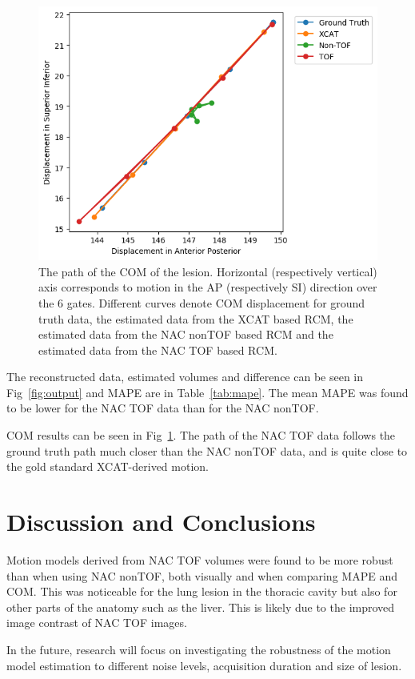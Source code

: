 \documentclass[10pt,twocolumn,twoside,letterpaper]{IEEEtran}
\begin{document}
\begin{figure}[H]
    \centering
    \includegraphics[width=1.0\linewidth]{figures/TOF.png}
    \captionsetup{singlelinecheck=false, justification=centering}
    \caption{The path of the \gls{COM} of the lesion. Horizontal (respectively vertical) axis corresponds to motion in the \gls{AP} (respectively \gls{SI}) direction over the $6$ gates. Different curves denote \gls{COM} displacement for  ground truth data, the estimated data from the \gls{XCAT} based \gls{RCM}, the estimated data from the \gls{NAC} \gls{nonTOF} based \gls{RCM} and the estimated data from the \gls{NAC} \gls{TOF} based \gls{RCM}.}
    \label{fig:com_graph}
\end{figure}

 The reconstructed data, estimated volumes and difference can be seen in Fig~\ref{fig:output} and \gls{MAPE} are in Table~\ref{tab:mape}. The mean \gls{MAPE} was found to be lower for the \gls{NAC} \gls{TOF} data than for the \gls{NAC} \gls{nonTOF}.

 \gls{COM} results can be seen in Fig~\ref{fig:com_graph}. The path of the \gls{NAC} \gls{TOF} data follows the ground truth path much closer than the \gls{NAC} \gls{nonTOF} data, and is quite close to the gold standard \gls{XCAT}-derived motion.

\section{Discussion and Conclusions}
Motion models derived from \gls{NAC} \gls{TOF} volumes were found to be more robust than when using \gls{NAC} \gls{nonTOF}, both visually and when comparing \gls{MAPE} and \gls{COM}. This was noticeable for the lung lesion in the thoracic cavity but also for other parts of the anatomy such as the liver. This is likely due to the improved image contrast of \gls{NAC} \gls{TOF} images.

In the future, research will focus on investigating the robustness of the motion model estimation to different noise levels, acquisition duration and size of lesion.

\AtNextBibliography{\scriptsize}
\printbibliography
\end{document}
